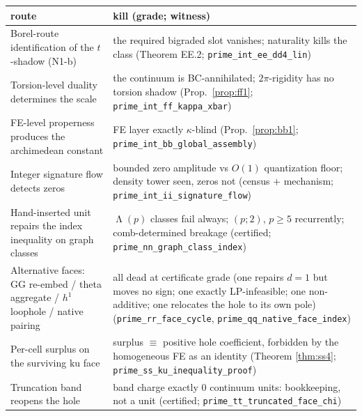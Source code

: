 \documentclass[11pt,reqno]{amsart}
\theoremstyle{plain}
\theoremstyle{definition}
\theoremstyle{remark}
\newcommand{\ku}{\mathrm{ku}}
\DeclareMathOperator{\Lam}{\Lambda}
\begin{document}
\begin{center}
\footnotesize
\begin{tabular}{>{\raggedright\arraybackslash}p{} >{\raggedright\arraybackslash}p{}}
\toprule
\textbf{route} & \textbf{kill (grade; witness)} \\
\midrule
Borel-route identification of the $t$-shadow (N1-b) &
the required bigraded slot vanishes; naturality kills the class (Theorem EE.2;
\texttt{prime\_\allowbreak int\_\allowbreak ee\_\allowbreak dd4\_\allowbreak lin}) \\[2pt]
Torsion-level duality determines the scale &
the continuum is BC-annihilated; $2\pi$-rigidity has no torsion shadow (Prop.\
\ref{prop:ff1}; \texttt{prime\_\allowbreak int\_\allowbreak ff\_\allowbreak kappa\_\allowbreak xbar}) \\[2pt]
FE-level properness produces the archimedean constant &
FE layer exactly $\kappa$-blind (Prop.\ \ref{prop:bb1};
\texttt{prime\_\allowbreak int\_\allowbreak bb\_\allowbreak global\_\allowbreak assembly}) \\[2pt]
Integer signature flow detects zeros &
bounded zero amplitude vs $O(1)$ quantization floor; density tower seen, zeros not
(census $+$ mechanism; \texttt{prime\_\allowbreak int\_\allowbreak ii\_\allowbreak signature\_\allowbreak flow}) \\[2pt]
Hand-inserted unit repairs the index inequality on graph classes &
$\Lam(p)$ classes fail always; $(p;2)$, $p \ge 5$ recurrently; comb-determined breakage
(certified; \texttt{prime\_\allowbreak nn\_\allowbreak graph\_\allowbreak class\_\allowbreak index}) \\[2pt]
Alternative faces: GG re-embed / theta aggregate / $h^1$ loophole / native pairing &
all dead at certificate grade (one repairs $d{=}1$ but moves no sign; one exactly
LP-infeasible; one non-additive; one relocates the hole to its own pole)
(\texttt{prime\_\allowbreak rr\_\allowbreak face\_\allowbreak cycle}, \texttt{prime\_\allowbreak qq\_\allowbreak native\_\allowbreak face\_\allowbreak index}) \\[2pt]
Per-cell surplus on the surviving $\ku$ face &
surplus $\equiv$ positive hole coefficient, forbidden by the homogeneous FE as an identity
(Theorem \ref{thm:ss4}; \texttt{prime\_\allowbreak ss\_\allowbreak ku\_\allowbreak inequality\_\allowbreak proof}) \\[2pt]
Truncation band reopens the hole &
band charge exactly $0$ continuum units: bookkeeping, not a unit (certified;
\texttt{prime\_\allowbreak tt\_\allowbreak truncated\_\allowbreak face\_\allowbreak chi}) \\[2pt]

\end{tabular}
\end{center}
\end{document}
